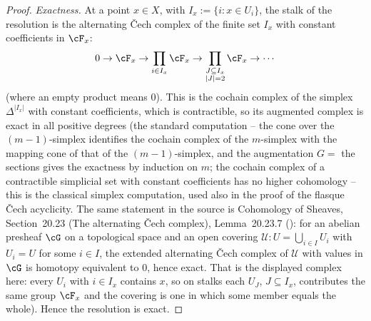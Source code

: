 \begin{proof}
\emph{Exactness.}  At a point $x\in X$, with
$I_x:=\{i:x\in U_i\}$, the stalk of the resolution is the alternating
Čech complex of the finite set $I_x$ with constant coefficients in
$\cF_x$:
\[
0\to\cF_x\to\prod_{i\in I_x}\cF_x\to\prod_{\substack{J\subseteq I_x\\|J|=2}}\cF_x\to\cdots
\]
(where an empty product means $0$).  This is the cochain complex of
the simplex $\Delta^{|I_x|}$ with constant coefficients, which is
contractible, so its augmented complex is exact in all positive
degrees (the standard computation -- the cone over the $(m-1)$-simplex
identifies the cochain complex of the $m$-simplex with the mapping
cone of that of the $(m-1)$-simplex, and the augmentation $G=$ the
sections gives the exactness by induction on $m$; the cochain complex
of a contractible simplicial set with constant coefficients has no
higher cohomology -- this is the classical simplex computation, used
also in the proof of the flasque Čech acyclicity.  The same statement
in the source is Cohomology of Sheaves, Section~20.23 (The alternating
Čech complex), Lemma~20.23.7 (): for an abelian
presheaf $\cG$ on a topological space and an open covering
$\mathcal U:U=\bigcup_{i\in I}U_i$ with $U_i=U$ for some $i\in I$, the
extended alternating Čech complex of $\mathcal U$ with values in $\cG$
is homotopy equivalent to $0$, hence exact.  That is the displayed
complex here: every $U_i$ with $i\in I_x$ contains $x$, so on stalks
each $U_J$, $J\subseteq I_x$, contributes the same group $\cF_x$ and
the covering is one in which some member equals the whole).  Hence the
resolution is exact.


\end{proof}
